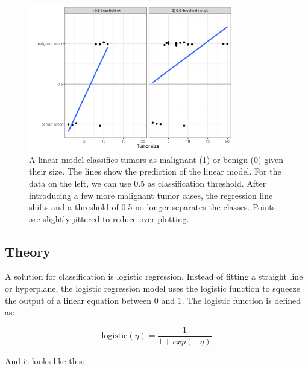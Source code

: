 \documentclass[
  11pt,
]{scrbook}
\begin{document}
\begin{figure}

{\centering \includegraphics[width=0.8\textwidth]{images/linear-class-threshold-1} 

}

\caption{A linear model classifies tumors as malignant (1) or benign (0) given their size. The lines show the prediction of the linear model. For the data on the left, we can use 0.5 as classification threshold. After introducing a few more malignant tumor cases, the regression line shifts and a threshold of 0.5 no longer separates the classes. Points are slightly jittered to reduce over-plotting. }\label{fig:linear-class-threshold}
\end{figure}

\hypertarget{theory}{%
\subsection{Theory}\label{theory}}

A solution for classification is logistic regression.
Instead of fitting a straight line or hyperplane, the logistic regression model uses the logistic function to squeeze the output of a linear equation between 0 and 1.
The logistic function is defined as:

\[\text{logistic}(\eta)=\frac{1}{1+exp(-\eta)}\]

And it looks like this:
\end{document}
